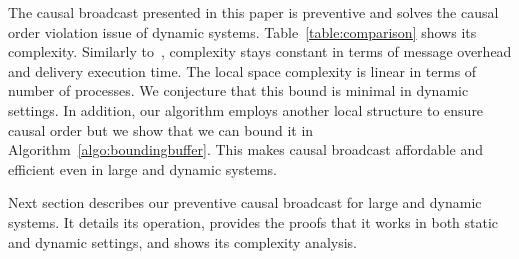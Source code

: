 The causal broadcast presented in this paper is preventive and solves the causal
order violation issue of dynamic systems.  Table~\ref{table:comparison} shows
its complexity. Similarly to~\cite{friedman2004causal}, complexity stays
constant in terms of message overhead and delivery execution time. The local
space complexity is linear in terms of number of processes. We conjecture that
this bound is minimal in dynamic settings. In addition, our algorithm employs
another local structure to ensure causal order but we show that we can bound it
in Algorithm~\ref{algo:boundingbuffer}. This makes causal broadcast affordable
and efficient even in large and dynamic systems.

Next section describes our preventive causal broadcast for large and dynamic
systems. It details its operation, provides the proofs that it works in both
static and dynamic settings, and shows its complexity analysis.

